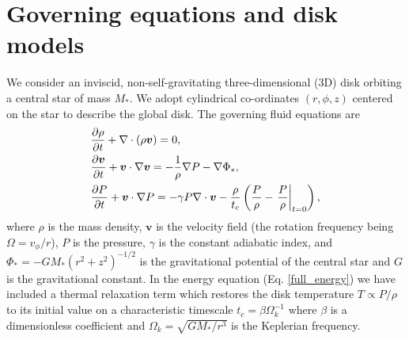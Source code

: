 \section{Governing equations and disk models}
We consider  an inviscid, non-self-gravitating three-dimensional (3D)
disk orbiting a central star of mass $M_*$. We adopt cylindrical
co-ordinates $(r,\phi, z)$ centered on the star to describe the global
disk. The governing fluid equations are
\begin{align}
  &\frac{\partial\rho}{\partial t} + \nabla\cdot{\left(\rho\bm{v}\right)} = 0,\\
  &\frac{\partial\bm{v}}{\partial t} + \bm{v}\cdot\nabla\bm{v} =
  -\frac{1}{\rho}\nabla P - \nabla\Phi_*,\\
  &\frac{\partial P}{\partial t} + \bm{v}\cdot\nabla P  = - \gamma P
  \nabla\cdot\bm{v} - \frac{\rho}{t_c}\left(\frac{P}{\rho} -
    \left.\frac{P}{\rho}\right|_{t=0}\right), \label{full_energy}
\end{align}
where $\rho$ is the mass density, $\bm{v}$ is the velocity field (the
rotation frequency being $\Omega=v_\phi/r$), $P$
is the pressure, $\gamma$ is the constant adiabatic index, and $\Phi_*
= -GM_*(r^2 + z^2)^{-1/2}$ is the gravitational potential of the
central star and $G$ is the gravitational constant. 
In the energy equation (Eq. \ref{full_energy}) we have
included a thermal relaxation term which restores the disk temperature
$T\propto P/\rho$ to its initial value on a characteristic timescale
$t_c=\beta\Omega_k^{-1}$ where $\beta$ is a dimensionless coefficient
and $\Omega_k=\sqrt{GM_*/r^3}$ is the Keplerian frequency. 

